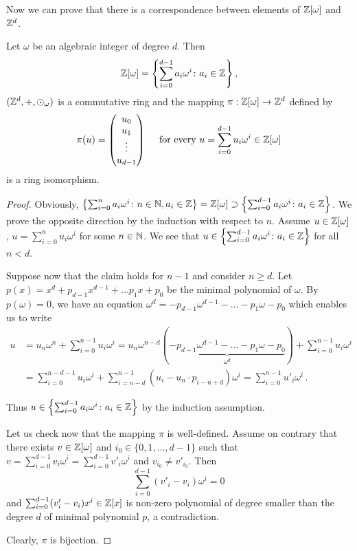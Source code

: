 Now we can prove that there is a correspondence between elements of $\mathbb{Z}[\omega]$ and $\mathbb{Z}^d$.

\begin{theo}
Let  $\omega$ be an algebraic integer of degree $d$. Then 
$$
\mathbb{Z}[\omega] =\left\{\sum_{i=0}^{d-1} a_i \omega^i \colon a_i\in\mathbb{Z} \right\},
$$ 
$(\mathbb{Z}^d,+,\odot_\omega)$ is a commutative ring and the mapping $\pi:\mathbb{Z}[\omega] \rightarrow \mathbb{Z}^{d}$ defined by 
$$
\pi(u)=\begin{pmatrix} {u}_0 \\ {u}_1 \\ \vdots \\ {u}_{d-1} \end{pmatrix} \quad \text{ for every } u=\sum_{i=0}^{d-1} u_i \omega^i \in \mathbb{Z}[\omega]
$$
is a ring isomorphism.
\end{theo}
\begin{proof}
Obviously, $\left\{\sum_{i=0}^{n} a_i \omega^i\colon n\in\mathbb{N}, a_i\in\mathbb{Z} \right\}=\mathbb{Z}[\omega] \supset \left\{\sum_{i=0}^{d-1} a_i \omega^i\colon a_i\in\mathbb{Z} \right\}$. We prove the opposite direction by the induction with respect to $n$. Assume $u\in \mathbb{Z}[\omega]$, $u=\sum_{i=0}^n u_i \omega^i$ for some $n\in\mathbb{N}$. We see that $u\in \left\{\sum_{i=0}^{d-1} a_i \omega^i\colon a_i\in\mathbb{Z} \right\}$ for all $n< d$. 

Suppose now that the claim holds for $n-1$ and consider $n\geq d$. Let $p(x)=x^d +p_{d-1}x^{d-1}+ \dots p_1 x+p_0$ be the minimal polynomial of $\omega$.  By $p(\omega)=0$, we have an equation $\omega^d =-p_{d-1}\omega^{d-1}- \dots -p_1\omega-p_0$ which enables us to write
\begin{align*}
u&=u_n\omega^n + \sum_{i=0}^{n-1} u_i \omega^i=u_n \omega^{n-d}(\underbrace{-p_{d-1}\omega^{d-1}- \dots -p_1\omega-p_0}_{\omega^d})+ \sum_{i=0}^{n-1} u_i \omega^i\\
    &=\sum_{i=0}^{n-d-1} u_i \omega^i+ \sum_{i=n-d}^{n-1} (u_i-u_n \cdot p_{i-n+d}) \omega^i=\sum_{i=0}^{n-1} u'_i \omega^i\,.
\end{align*}

Thus $u\in \left\{\sum_{i=0}^{d-1} a_i \omega^i \colon a_i\in\mathbb{Z} \right\}$ by the induction assumption.

Let us check now that the mapping $\pi$ is well-defined. Assume on contrary that there exists $v\in \mathbb{Z}[\omega]$ and $i_0\in\{0,1,\dots,d-1\}$ such that $v=\sum_{i=0}^{d-1} v_i \omega^i=\sum_{i=0}^{d-1} v'_i \omega^i$ and $v_{i_0} \neq v'_{i_0}$. Then
$$
    \sum_{i=0}^{d-1} (v'_i-v_i) \omega^i=0
$$
and $\sum_{i=0}^{d-1} (v'_i-v_i) x^i \in \mathbb{Z}[x]$ is non-zero polynomial of degree smaller than the degree $d$ of minimal polynomial $p$, a contradiction.

Clearly, $\pi$ is bijection. 


\end{proof}
